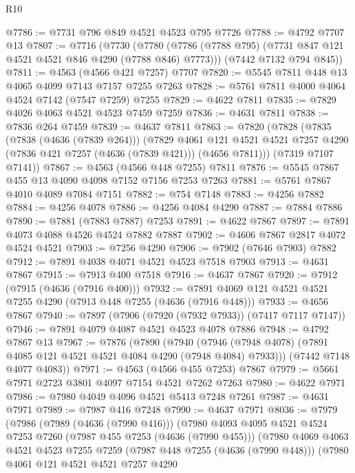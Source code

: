 \begin{lexlean}{R10}
\begin{coremodule}
@7786 := @7731 @796 @849 @4521 @4523 @795 @7726
@7788 := @4792 @7707 @13
@7807 := @7716
    (@7730
      (@7780 (@7786 (@7788 @795) (@7731 @847 @121 @4521 @4521 @846 @4290 (@7788 @846) @7773)))
      (@7442 @7132 @794 @845))
@7811 := @4563 (@4566 @421 @7257) @7707
@7820 := @5545 @7811 @448 @13 @4065 @4099 @7143 @7157 @7255 @7263
@7828 := @5761 @7811 @4000 @4064 @4524 @7142 (@7547 @7259) @7255
@7829 := @4622 @7811
@7835 := @7829 @4026 @4063 @4521 @4523 @7459 @7259
@7836 := @4631 @7811
@7838 := @7836 @264 @7459
@7839 := @4637 @7811
@7863 := @7820
    (@7828
      (@7835
        (@7838 (@4636 (@7839 @264)))
        (@7829
          @4061
          @121
          @4521
          @4521
          @7257
          @4290
          (@7836 @421 @7257 (@4636 (@7839 @421)))
          (@4656 @7811)))
      (@7319 @7107 @7141))
@7867 := @4563 (@4566 @448 @7255) @7811
@7876 := @5545 @7867 @455 @13 @4090 @4098 @7152 @7156 @7253 @7263
@7881 := @5761 @7867 @4010 @4089 @7084 @7151
@7882 := @754 @7148
@7883 := @4256 @7882
@7884 := @4256 @4078
@7886 := @4256 @4084 @4290
@7887 := @7884 @7886
@7890 := @7881 (@7883 @7887) @7253
@7891 := @4622 @7867
@7897 := @7891 @4073 @4088 @4526 @4524 @7882 @7887
@7902 := @4606 @7867 @2817 @4072 @4524 @4521
@7903 := @7256 @4290
@7906 := @7902 (@7646 @7903) @7882
@7912 := @7891 @4038 @4071 @4521 @4523 @7518 @7903
@7913 := @4631 @7867
@7915 := @7913 @400 @7518
@7916 := @4637 @7867
@7920 := @7912 (@7915 (@4636 (@7916 @400)))
@7932 := @7891 @4069 @121 @4521 @4521 @7255 @4290 (@7913 @448 @7255 (@4636 (@7916 @448)))
@7933 := @4656 @7867
@7940 := @7897 (@7906 (@7920 (@7932 @7933)) (@7417 @7117 @7147))
@7946 := @7891 @4079 @4087 @4521 @4523 @4078 @7886
@7948 := @4792 @7867 @13
@7967 := @7876
    (@7890
      (@7940 (@7946 (@7948 @4078) (@7891 @4085 @121 @4521 @4521 @4084 @4290 (@7948 @4084) @7933)))
      (@7442 @7148 @4077 @4083))
@7971 := @4563 (@4566 @455 @7253) @7867
@7979 := @5661 @7971 @2723 @3801 @4097 @7154 @4521 @7262 @7263
@7980 := @4622 @7971
@7986 := @7980 @4049 @4096 @4521 @5413 @7248 @7261
@7987 := @4631 @7971
@7989 := @7987 @416 @7248
@7990 := @4637 @7971
@8036 := @7979
    (@7986
      (@7989 (@4636 (@7990 @416)))
      (@7980
        @4093
        @4095
        @4521
        @4524
        @7253
        @7260
        (@7987 @455 @7253 (@4636 (@7990 @455)))
        (@7980
          @4069
          @4063
          @4521
          @4523
          @7255
          @7259
          (@7987 @448 @7255 (@4636 (@7990 @448)))
          (@7980
            @4061
            @121
            @4521
            @4521
            @7257
            @4290

\end{coremodule}
\end{lexlean}
